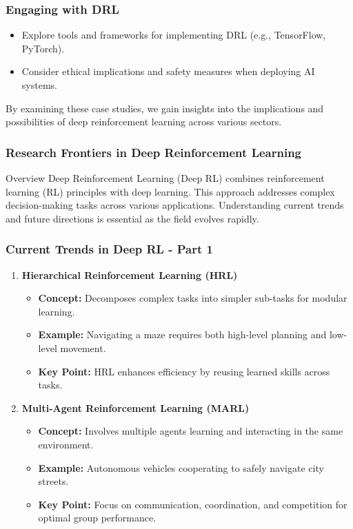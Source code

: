 \documentclass[aspectratio=169]{beamer}
\begin{document}
\begin{frame}[fragile]
    \frametitle{Engaging with DRL}
    \begin{itemize}
        \item Explore tools and frameworks for implementing DRL (e.g., TensorFlow, PyTorch).
        \item Consider ethical implications and safety measures when deploying AI systems.
    \end{itemize}
    By examining these case studies, we gain insights into the implications and possibilities of deep reinforcement learning across various sectors.
\end{frame}

\begin{frame}[fragile]
  \frametitle{Research Frontiers in Deep Reinforcement Learning}
  \begin{block}{Overview}
    Deep Reinforcement Learning (Deep RL) combines reinforcement learning (RL) principles with deep learning. This approach addresses complex decision-making tasks across various applications. Understanding current trends and future directions is essential as the field evolves rapidly.
  \end{block}
\end{frame}

\begin{frame}[fragile]
  \frametitle{Current Trends in Deep RL - Part 1}
  \begin{enumerate}
    \item \textbf{Hierarchical Reinforcement Learning (HRL)}
      \begin{itemize}
        \item \textbf{Concept:} Decomposes complex tasks into simpler sub-tasks for modular learning.
        \item \textbf{Example:} Navigating a maze requires both high-level planning and low-level movement.
        \item \textbf{Key Point:} HRL enhances efficiency by reusing learned skills across tasks.
      \end{itemize}
      
    \item \textbf{Multi-Agent Reinforcement Learning (MARL)}
      \begin{itemize}
        \item \textbf{Concept:} Involves multiple agents learning and interacting in the same environment.
        \item \textbf{Example:} Autonomous vehicles cooperating to safely navigate city streets.
        \item \textbf{Key Point:} Focus on communication, coordination, and competition for optimal group performance.
      \end{itemize}
  \end{enumerate}
\end{frame}
\end{document}
